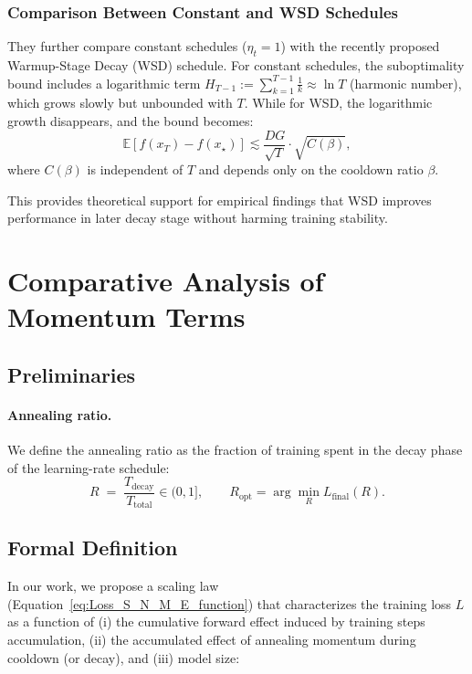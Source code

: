 \documentclass[letterpaper]{article} %
\newcommand{\E}{\mathbb{E}}
\begin{document}
\subsubsection{Comparison Between Constant and WSD Schedules}

They further compare constant schedules ($\eta_t=1$) with the recently proposed Warmup-Stage Decay (WSD) schedule. 
For constant schedules, the suboptimality bound includes a logarithmic term $H_{T-1} := \sum_{k=1}^{T-1} \frac{1}{k} \approx \ln T$ (harmonic number), which grows slowly but unbounded with $T$. While for WSD, the logarithmic growth disappears, and the bound becomes:
\begin{equation}
	\E[f(x_T) - f(x_\star)] \lesssim \frac{DG}{\sqrt{T}} \cdot \sqrt{C(\beta)},
\end{equation}
where $C(\beta)$ is independent of $T$ and depends only on the cooldown ratio $\beta$.

This provides theoretical support for empirical findings that WSD improves performance in later decay stage without harming training stability.


\section{Comparative Analysis of Momentum Terms}
\label{subsec:fitting_accuracy}
\subsection{Preliminaries}
\label{sec:prelim}

\paragraph{Annealing ratio.}
We define the annealing ratio as the fraction of training spent in the decay phase of the learning-rate schedule:
\[
R \;=\; \frac{T_{\mathrm{decay}}}{T_{\mathrm{total}}}\in(0,1],\qquad
R_{\mathrm{opt}}=\arg\min_R L_{\mathrm{final}}(R).
\]


\subsection{Formal Definition}

In our work, we propose a scaling law (Equation~\ref{eq:Loss_S_N_M_E_function}) that characterizes the training loss \(L\) as a function of (i) the cumulative forward effect induced by training steps accumulation, (ii) the accumulated effect of annealing momentum during cooldown (or decay), and (iii) model size:
\end{document}
